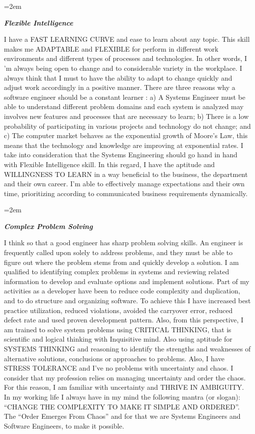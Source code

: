 \documentclass[paper=a4,fontsize=11pt]{scrartcl} %
\newlength{\spacebox}
\newcommand{\sepspace}{\vspace*{1em}}		%
\newcommand{\PersonalEntry}[2]{
		\noindent\hangindent=2em\hangafter=0 %
		\parbox{\spacebox}{        %
		\textit{#1}}		       %
		\hspace{1.5em} #2 \par}    %
\newcommand{\SkillsEntry}[2]{      %
		\noindent\hangindent=2em\hangafter=0 %
		\parbox{\spacebox}{        %
		\textit{#1}}			   %
		\hspace{1.5em} #2 \par}    %
\begin{document}
\sepspace

\SkillsEntry{\large{\textbf{Flexible Intelligence}}}{
I have a FAST LEARNING CURVE and ease to learn about any topic. This skill makes me ADAPTABLE and FLEXIBLE for perform in different work environments and different types of processes and technologies. In other words, I 'm always being open to change and to considerable variety in the workplace. I always think that I must to have the ability to adapt to change quickly and adjust work accordingly in a positive manner. There are three reasons why a software engineer should be a constant learner : a) A Systems Engineer must be able to understand different problem domains and each system is analyzed may involves new features and processes that are necessary to learn;  b) There is a low probability of participating in various projects and technology do not change; and c) The computer market behaves as the exponential growth of Moore's Law, this means that the technology and knowledge are improving at exponential rates. I take into consideration that the Systems Engineering should go hand in hand with Flexible Intelligence skill. In this regard, I have the aptitude and WILLINGNESS TO LEARN in a way beneficial to the business, the department and their own career. I'm able to effectively manage expectations and their own time, prioritizing according to communicated business requirements dynamically. 
}

\sepspace

\SkillsEntry{\large{\textbf{Complex Problem Solving}}}{
I think so that a good engineer has sharp problem solving skills. An engineer is frequently called upon solely to address problems, and they must be able to figure out where the problem stems from and quickly develop a solution. I am qualified to identifying complex problems in systems and reviewing related information to develop and evaluate options and implement solutions. Part of my activities as a developer have been to reduce code complexity and duplication, and to do structure and organizing software. To achieve this I have increased best practice utilization, reduced violations, avoided the carryover error, reduced defect rate and used proven development pattern. Also, from this perspective, I am trained to solve system problems using CRITICAL THINKING, that is scientific and logical thinking with Inquisitive mind. Also using aptitude for SYSTEMS THINKING and reasoning to identify the strengths and weaknesses of alternative solutions, conclusions or approaches to problems. Also, I have STRESS TOLERANCE and I've no problems with uncertainty and chaos. I consider that my profession relies on managing uncertainty and order the chaos. For this reason, I am familiar with uncertainty and THRIVE IN AMBIGUITY. In my working life I always have in my mind the following mantra (or slogan): “CHANGE THE COMPLEXITY TO MAKE IT SIMPLE AND ORDERED”. The “Order Emerges From Chaos” and for that we are Systems Engineers and Software Engineers, to make it possible.
}
\end{document}
